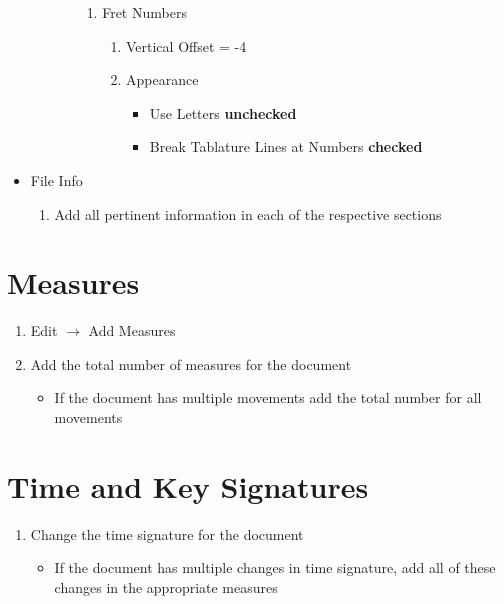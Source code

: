 \documentclass[]{memoir}
\begin{document}
\begin{itemize}
\begin{enumerate}
\begin{enumerate}
\begin{enumerate}
      \item Fret Numbers
        \begin{enumerate}
        \item Vertical Offset = -4
        \item Appearance
          \begin{itemize}
          \item Use Letters \textbf{unchecked}
          \item Break Tablature Lines at Numbers \textbf{checked}
          \end{itemize}
        \end{enumerate}
      \end{enumerate}
    \end{enumerate}
  \end{enumerate}
\item File Info
  \begin{enumerate}
  \item Add all pertinent information in each of the respective sections 
  \end{enumerate}
\end{itemize}

\section{Measures}
\label{sec:measures}

\begin{enumerate}
\item Edit $\rightarrow$ Add Measures
\item Add the total number of measures for the document
  \begin{itemize}
  \item If the document has multiple movements add the total number for all movements
  \end{itemize}
\end{enumerate}

\section{Time and Key Signatures}
\label{sec:time-key-signatures}

\begin{enumerate}
\item Change the time signature for the document
  \begin{itemize}
  \item If the document has multiple changes in time signature, add all of these changes in the appropriate measures
  \end{itemize}
\end{enumerate}
\end{document}
